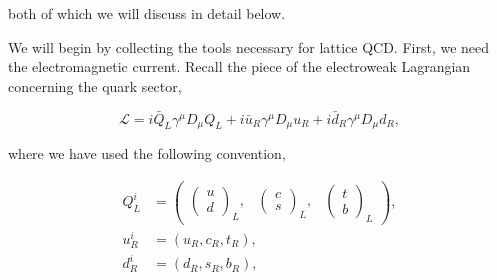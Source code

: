 \documentclass{article}
\numberwithin{equation}{section} %
\begin{document}
\noindent both of which we will discuss in detail below. 

We will begin by collecting the tools necessary for lattice QCD. First, we need the electromagnetic current. Recall the piece of the electroweak Lagrangian concerning the quark sector,

\begin{equation}
\mathcal{L}=i\bar{Q}_L\gamma^\mu D_\mu Q_L + i\bar{u}_R\gamma^\mu D_\mu u_R + i\bar{d}_R\gamma^\mu D_\mu d_R,
\label{ewqLagr}
\end{equation}

\noindent where we have used the following convention\cite{sm},

\begin{equation}
\begin{split}
Q_L^i&=\begin{pmatrix}
\begin{pmatrix}
u\\d
\end{pmatrix}_L, & \begin{pmatrix}
c\\s
\end{pmatrix}_L, & \begin{pmatrix}
t\\b
\end{pmatrix}_L
\end{pmatrix},\\
u^i_R&=(u_R	,c_R,t_R),\\
d^i_R&=(d_R,s_R,b_R),
\end{split}
\end{equation}


%
%
\end{document}
